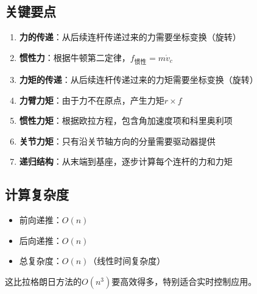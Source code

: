 \documentclass[12pt,a4paper]{article}
\begin{document}
\subsection{关键要点}

\begin{enumerate}
\item \textbf{力的传递}：从后续连杆传递过来的力需要坐标变换（旋转）
\item \textbf{惯性力}：根据牛顿第二定律，$f_{\text{惯性}} = m \dot{v}_c$
\item \textbf{力矩的传递}：从后续连杆传递过来的力矩需要坐标变换（旋转）
\item \textbf{力臂力矩}：由于力不在原点，产生力矩$r \times f$
\item \textbf{惯性力矩}：根据欧拉方程，包含角加速度项和科里奥利项
\item \textbf{关节力矩}：只有沿关节轴方向的分量需要驱动器提供
\item \textbf{递归结构}：从末端到基座，逐步计算每个连杆的力和力矩
\end{enumerate}

\subsection{计算复杂度}

\begin{itemize}
\item 前向递推：$O(n)$
\item 后向递推：$O(n)$
\item 总复杂度：$O(n)$（线性时间复杂度）
\end{itemize}

这比拉格朗日方法的$O(n^3)$要高效得多，特别适合实时控制应用。
\end{document}
